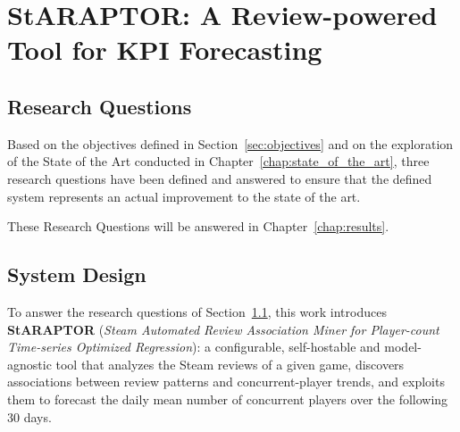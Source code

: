 \chapter{StARAPTOR: A Review-powered Tool for KPI Forecasting}
\label{chap:methodology}

\section{Research Questions}
\label{sec:research_questions}

\noindent Based on the objectives defined in Section~\ref{sec:objectives} and on the exploration of the State of the Art conducted in Chapter~\ref{chap:state_of_the_art}, three research questions have been defined and answered to ensure that the defined system represents an actual improvement to the state of the art.




These Research Questions will be answered in Chapter~\ref{chap:results}.

\section{System Design}
\label{sec:system_design}

\noindent To answer the research questions of Section~\ref{sec:research_questions}, this work introduces \textbf{StARAPTOR} (\emph{Steam Automated Review Association Miner for Player-count Time-series Optimized Regression}): a configurable, self-hostable and model-agnostic tool that analyzes the Steam reviews of a given game, discovers associations between review patterns and concurrent-player trends, and exploits them to forecast the daily mean number of concurrent players over the following 30 days.


